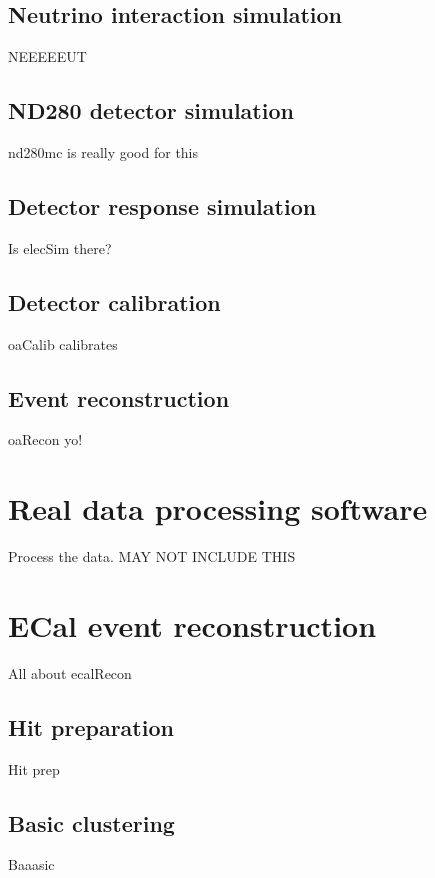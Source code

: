\subsection{Neutrino interaction simulation}
\label{subsec:NeutrinoInteractionSimulation}
NEEEEEUT

\subsection{ND280 detector simulation}
\label{subsec:ND280DetectorSimulation}
nd280mc is really good for this

\subsection{Detector response simulation}
\label{subsec:DetectorResponseSimulation}
Is elecSim there?

\subsection{Detector calibration}
\label{subsec:DetectorCalibration}
oaCalib calibrates

\subsection{Event reconstruction}
\label{subsec:EventReconstruction}
oaRecon yo!


\section{Real data processing software}
\label{sec:datachain}
Process the data.  MAY NOT INCLUDE THIS


\section{ECal event reconstruction}
\label{sec:ECalEventReconstruction}
All about ecalRecon

\subsection{Hit preparation}
\label{subsec:ECalHitPerparation}
Hit prep

\subsection{Basic clustering}
\label{subsec:ECalBasicClustering}
Baaasic

